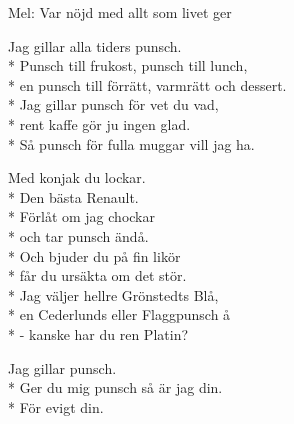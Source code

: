 \begin{SongText}[Djungelpunsch]
    \begin{SongInfo}
        Mel: Var nöjd med allt som livet ger
    \end{SongInfo}
    \begin{SongVerse}
        Jag gillar alla tiders punsch.\\*%
        Punsch till frukost, punsch till lunch,\\*%
        en punsch till förrätt, varmrätt och dessert.\\*%
        Jag gillar punsch för vet du vad,\\*%
        rent kaffe gör ju ingen glad.\\*%
        Så punsch för fulla muggar vill jag ha.
    \end{SongVerse}
    \begin{SongVerse}
        Med konjak du lockar.\\*%
        Den bästa Renault.\\*%
        Förlåt om jag chockar\\*%
        och tar punsch ändå.\\*%
        Och bjuder du på fin likör\\*%
        får du ursäkta om det stör.\\*%
        Jag väljer hellre Grönstedts Blå,\\*%
        en Cederlunds eller Flaggpunsch å\\*%
        - kanske har du ren Platin?
    \end{SongVerse}
    \begin{SongVerse}
        Jag gillar punsch.\\*%
        Ger du mig punsch så är jag din.\\*%
        För evigt din.
    \end{SongVerse}
\end{SongText}
